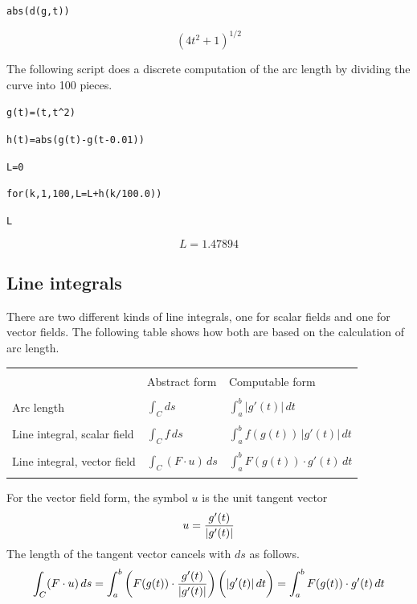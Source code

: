 \medskip
\verb$abs(d(g,t))$

$$(4t^2+1)^{1/2}$$

\medskip
\noindent
The following script does a discrete computation of the arc length by dividing
the curve into 100 pieces.

\medskip
\verb$g(t)=(t,t^2)$

\verb$h(t)=abs(g(t)-g(t-0.01))$

\verb$L=0$

\verb$for(k,1,100,L=L+h(k/100.0))$

\verb$L$

$$L=1.47894$$

\newpage

\subsection{Line integrals}

There are two different kinds of line integrals,
one for scalar fields and one
for vector fields.
The following table shows how both are based on the calculation of
arc length.

\bigskip

\begin{center}
\begin{tabular}{|lll|}
\hline
 & & \\
& Abstract form
& Computable form
\\
 & & \\
Arc length
& $\displaystyle{\int_C ds}$
& $\displaystyle{\int_a^b |g'(t)|\,dt}$
\\
 & & \\
Line integral, scalar field
& $\displaystyle{\int_C f\,ds}$
& $\displaystyle{\int_a^b f(g(t))\,|g'(t)|\,dt}$
\\
 & & \\
Line integral, vector field
& $\displaystyle{\int_C(F\cdot u)\,ds}$
& $\displaystyle{\int_a^b F(g(t))\cdot g'(t)\,dt}$
\\
 & & \\
\hline
\end{tabular}
\end{center}

\bigskip
\noindent
For the vector field form, the symbol $u$ is the unit tangent vector
$$u={g'(t)\over|g'(t)|}$$
The length of the tangent vector cancels with $ds$
as follows.
$$\int_C(F\cdot u)\,ds
=\int_a^b\bigg(F(g(t))\cdot{g'(t)\over|g'(t)|}\bigg)\,\bigg(|g'(t)|\,dt\bigg)
=\int_a^b F(g(t))\cdot g'(t)\,dt
$$

